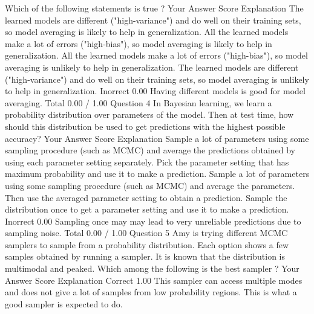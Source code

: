Which of the following statements is true ?
Your Answer		Score	Explanation
The learned models are different ("high-variance") and do well on their training sets, so model averaging is likely to help in generalization.			
All the learned models make a lot of errors ("high-bias"), so model averaging is likely to help in generalization.			
All the learned models make a lot of errors ("high-bias"), so model averaging is unlikely to help in generalization.			
The learned models are different ("high-variance") and do well on their training sets, so model averaging is unlikely to help in generalization.	Inorrect	0.00	Having different models is good for model averaging.
Total		0.00 / 1.00	
Question 4
In Bayesian learning, we learn a probability distribution over parameters of the model. Then at test time, how should this distribution be used to get predictions with the highest possible accuracy?
Your Answer		Score	Explanation
Sample a lot of parameters using some sampling procedure (such as MCMC) and average the predictions obtained by using each parameter setting separately.			
Pick the parameter setting that has maximum probability and use it to make a prediction.			
Sample a lot of parameters using some sampling procedure (such as MCMC) and average the parameters. Then use the averaged parameter setting to obtain a prediction.			
Sample the distribution once to get a parameter setting and use it to make a prediction.	Inorrect	0.00	Sampling once may may lead to very unreliable predictions due to sampling noise.
Total		0.00 / 1.00	
Question 5
Amy is trying different MCMC samplers to sample from a probability distribution. Each option shows a few samples obtained by running a sampler. It is known that the distribution is multimodal and peaked. Which among the following is the best sampler ?
Your Answer		Score	Explanation
	Correct	1.00	This sampler can access multiple modes and does not give a lot of samples from low probability regions. This is what a good sampler is expected to do.
			
			
			
